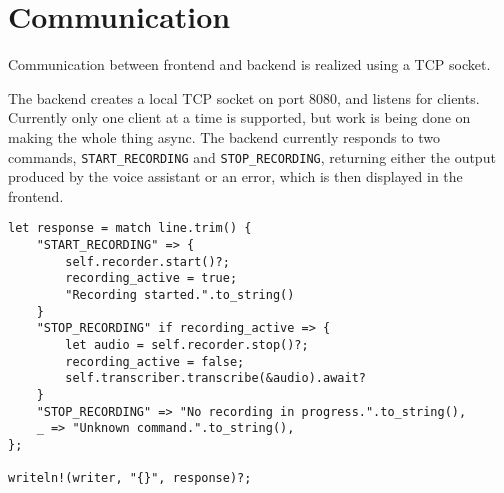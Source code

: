\renewcommand*\chapterpagestyle{scrheadings}
\chapter{Communication}

Communication between frontend and backend is realized using a TCP socket.

The backend creates a local TCP socket on port 8080, and listens for clients.
Currently only one client at a time is supported, but work is being done on making the whole thing async.
The backend currently responds to two commands, \texttt{START\_RECORDING} and \texttt{STOP\_RECORDING}, returning either the
output produced by the voice assistant or an error, which is then displayed in the frontend.

\begin{verbatim}
let response = match line.trim() {
    "START_RECORDING" => {
        self.recorder.start()?;
        recording_active = true;
        "Recording started.".to_string()
    }
    "STOP_RECORDING" if recording_active => {
        let audio = self.recorder.stop()?;
        recording_active = false;
        self.transcriber.transcribe(&audio).await?
    }
    "STOP_RECORDING" => "No recording in progress.".to_string(),
    _ => "Unknown command.".to_string(),
};

writeln!(writer, "{}", response)?;
\end{verbatim}
